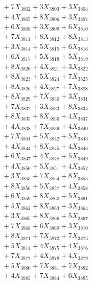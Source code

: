 \documentclass[a4paper,10pt]{article}
\begin{document}
{\begin{align}
&\;  + 7 X_{3802} + 3 X_{3803} + 3 X_{3804} \\[0.3ex]
&\;  + 4 X_{3805} + 8 X_{3806} + 3 X_{3807} \\[0.3ex]
&\;  + 6 X_{3808} + 3 X_{3809} + 6 X_{3810} \\[0.3ex]
&\;  + 7 X_{3811} + 8 X_{3812} + 8 X_{3813} \\[0.3ex]
&\;  + 3 X_{3814} + 5 X_{3815} + 6 X_{3816} \\[0.3ex]
&\;  + 6 X_{3817} + 5 X_{3818} + 5 X_{3819} \\[0.5ex]\allowbreak
&\;  + 8 X_{3820} + 4 X_{3821} + 3 X_{3822} \\[0.3ex]
&\;  + 8 X_{3823} + 5 X_{3824} + 7 X_{3825} \\[0.3ex]
&\;  + 8 X_{3826} + 4 X_{3827} + 7 X_{3828} \\[0.3ex]
&\;  + 8 X_{3829} + 7 X_{3830} + 3 X_{3831} \\[0.3ex]
&\;  + 7 X_{3832} + 3 X_{3833} + 8 X_{3834} \\[0.3ex]
&\;  + 8 X_{3835} + 8 X_{3836} + 4 X_{3837} \\[0.3ex]
&\;  + 4 X_{3838} + 7 X_{3839} + 4 X_{3840} \\[0.3ex]
&\;  + 7 X_{3841} + 5 X_{3842} + 5 X_{3843} \\[0.3ex]
&\;  + 4 X_{3844} + 8 X_{3845} + 4 X_{3846} \\[0.3ex]
&\;  + 6 X_{3847} + 4 X_{3848} + 5 X_{3849} \\[0.5ex]\allowbreak
&\;  + 4 X_{3850} + 5 X_{3851} + 4 X_{3852} \\[0.3ex]
&\;  + 3 X_{3853} + 7 X_{3854} + 8 X_{3855} \\[0.3ex]
&\;  + 8 X_{3856} + 5 X_{3857} + 4 X_{3858} \\[0.3ex]
&\;  + 6 X_{3859} + 8 X_{3860} + 5 X_{3861} \\[0.3ex]
&\;  + 5 X_{3862} + 8 X_{3863} + 3 X_{3864} \\[0.3ex]
&\;  + 3 X_{3865} + 8 X_{3866} + 5 X_{3867} \\[0.3ex]
&\;  + 7 X_{3868} + 6 X_{3869} + 3 X_{3870} \\[0.3ex]
&\;  + 8 X_{3871} + 7 X_{3872} + 7 X_{3873} \\[0.3ex]
&\;  + 5 X_{3874} + 4 X_{3875} + 4 X_{3876} \\[0.3ex]
&\;  + 7 X_{3877} + 4 X_{3878} + 4 X_{3879} \\[0.5ex]\allowbreak
&\;  + 5 X_{3880} + 7 X_{3881} + 7 X_{3882} \\[0.3ex]
&\;  + 4 X_{3883} + 7 X_{3884} + 6 X_{3885} \\[0.3ex]

\end{align}}
\end{document}
